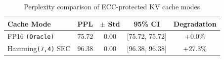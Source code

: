 \begin{table}[h]
\centering
\caption{Perplexity comparison of ECC-protected KV cache modes}
\begin{tabular}{lcccc}
\toprule
Cache Mode & PPL & $\pm$ Std & 95\% CI & Degradation \\
\midrule
FP16 \texttt{(Oracle)} & 75.72 & 0.00 & [75.72, 75.72] & +0.0\% \\
Hamming\texttt{(7,4)} SEC & 96.38 & 0.00 & [96.38, 96.38] & +27.3\% \\
\bottomrule
\end{tabular}
\end{table}